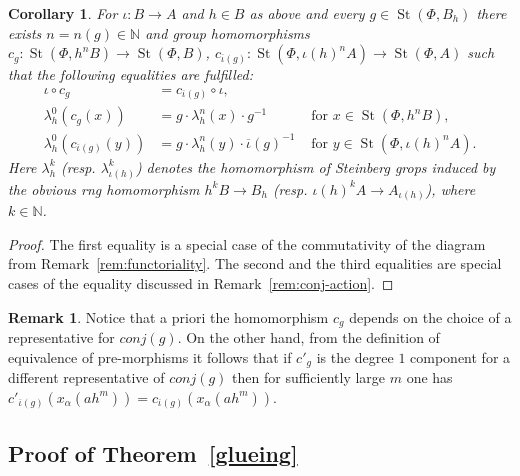 \documentclass[oneside, 11pt]{amsart} \pdfoutput=1
\newcommand{\K}{{\mathrm{K}}}
\newcommand{\St}{\mathop{\mathrm{St}}\nolimits}
\numberwithin{equation}{section}
\newtheorem{corollary}[lemma]{Corollary}
\theoremstyle{definition}
\newtheorem{rem}[lemma]{Remark}
\begin{document}
\begin{corollary}
\label{vorcor}
For $\iota \colon B \to A$ and $h \in B$ as above and every $g \in \St(\Phi, B_h)$ there exists $n = n(g) \in \mathbb{N}$ 
and group homomorphisms $c_g \colon \St(\Phi, h^nB) \to \St(\Phi, B)$, $c_{\overline{\iota}(g)} \colon \St(\Phi, \iota(h)^nA) \to \St(\Phi, A)$
such that the following equalities are fulfilled:
\begin{align}
 \label{eq:coherence} \iota \circ c_g &= c_{\overline{\iota}(g)} \circ \iota, &\\
 \label{eq:strictB} \lambda_h^0 (c_g (x)) &= g \cdot \lambda_h^n(x) \cdot g^{-1}&\text{ for }x \in \St(\Phi, h^nB),\\
 \label{eq:strictA} \lambda_h^0 (c_{\overline{\iota}(g)}(y)) &= g \cdot \lambda_h^n(y) \cdot \overline{\iota}(g)^{-1}&\text{ for }y \in \St(\Phi, \iota(h)^nA).
\end{align}
Here $\lambda_h^k$ (resp. $\lambda^k_{\iota(h)}$) denotes the homomorphism of Steinberg grops induced by the obvious rng homomorphism $h^kB \to B_h$ (resp. $\iota(h)^kA \to A_{\iota(h)}$), where $k \in \mathbb{N}$.
\end{corollary}
\begin{proof}
 The first equality is a special case of the commutativity of the diagram from Remark~\ref{rem:functoriality}.
 The second and the third equalities are special cases of the equality discussed in Remark~\ref{rem:conj-action}.
\end{proof}
\begin{rem}\label{rem:indendepence}
 Notice that a priori the homomorphism $c_g$ depends on the choice of a representative for $conj(g)$. On the other hand, from the definition of equivalence of pre-morphisms it follows that if $c'_g$ is the degree $1$ component for a different representative of $conj(g)$ then for sufficiently large $m$ one has $c'_{\overline{\iota}(g)}(x_{\alpha}(ah^m)) = c_{\overline{\iota}(g)}(x_{\alpha}(ah^m))$.
\end{rem}

\subsection{Proof of Theorem~\ref{glueing}}
\end{document}
